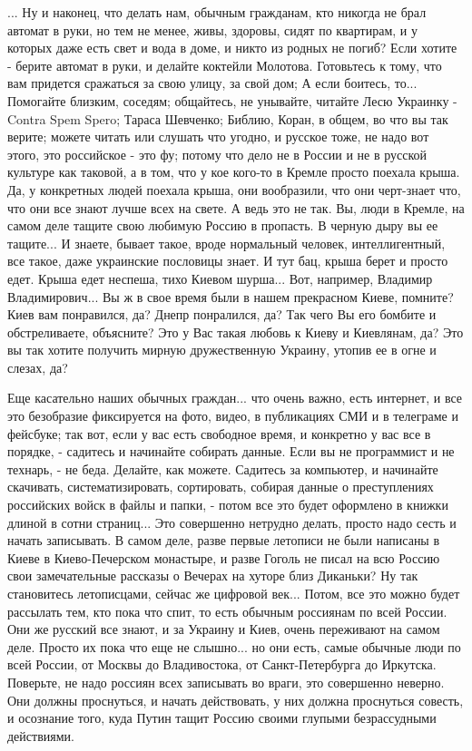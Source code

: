 ... Ну и наконец, что делать нам, обычным гражданам, кто никогда не брал
автомат в руки, но тем не менее, живы, здоровы, сидят по квартирам, и у которых
даже есть свет и вода в доме, и никто из родных не погиб? Если хотите - берите
автомат в руки, и делайте коктейли Молотова.  Готовьтесь к тому, что вам
придется сражаться за свою улицу, за свой дом; А если боитесь, то... Помогайте
близким, соседям; общайтесь, не унывайте, читайте Лесю Украинку - Contra Spem
Spero; Тараса Шевченко; Библию, Коран, в общем, во что вы так верите; можете
читать или слушать что угодно, и русское тоже, не надо вот этого, это российское - это фу;
потому что дело не в России и не в русской культуре как таковой, а в том, что у
кое кого-то в Кремле просто поехала крыша. Да, у конкретных людей поехала
крыша, они вообразили, что они черт-знает что, что они все знают лучше всех на
свете.  А ведь это не так. Вы, люди в Кремле, на самом деле тащите свою любимую
Россию в пропасть. В черную дыру вы ее тащите... И знаете, бывает такое, вроде
нормальный человек, интеллигентный, все такое, даже украинские пословицы знает.
И тут бац, крыша берет и просто едет. Крыша едет неспеша, тихо Киевом шурша...
Вот, например, Владимир Владимирович... Вы ж в свое время были в нашем
прекрасном Киеве, помните? Киев вам понравился, да? Днепр понралился, да? Так
чего Вы его бомбите и обстреливаете, объясните? Это у Вас такая любовь к Киеву
и Киевлянам, да? Это вы так хотите получить мирную дружественную Украину,
утопив ее в огне и слезах, да?

Еще касательно наших обычных граждан... что очень важно, есть интернет, и все
это безобразие фиксируется на фото, видео, в публикациях СМИ и в телеграме и
фейсбуке; так вот, если у вас есть свободное время, и конкретно у вас все в
порядке, - садитесь и начинайте собирать данные. Если вы не программист и не
технарь, - не беда.  Делайте, как можете. Садитесь за компьютер, и начинайте
скачивать, систематизировать, сортировать, собирая данные о преступлениях
российских войск в файлы и папки, - потом все это будет оформлено в книжки
длиной в сотни страниц...  Это совершенно нетрудно делать, просто надо сесть и
начать записывать. В самом деле, разве первые летописи не были написаны в Киеве
в Киево-Печерском монастыре, и разве Гоголь не писал на всю Россию свои
замечательные рассказы о Вечерах на хуторе близ Диканьки?  Ну так становитесь
летописцами, сейчас же цифровой век...  Потом, все это можно будет рассылать
тем, кто пока что спит, то есть обычным россиянам по всей России. Они же
русский все знают, и за Украину и Киев, очень переживают на самом деле. Просто
их пока что еще не слышно... но они есть, самые обычные люди по всей России, от
Москвы до Владивостока, от Санкт-Петербурга до Иркутска. Поверьте, не надо
россиян всех записывать во враги, это совершенно неверно. Они должны
проснуться, и начать действовать, у них должна проснуться совесть, и осознание
того, куда Путин тащит Россию своими глупыми безрассудными действиями. 

